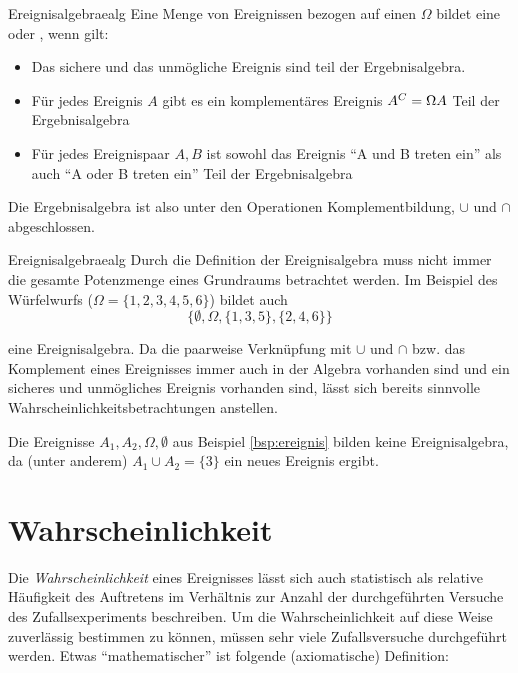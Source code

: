 \begin{definition}{Ereignisalgebra}{ealg}
Eine Menge von Ereignissen bezogen auf einen 
$\Omega$ bildet eine  oder , wenn gilt:

  \begin{itemize}
    \item Das sichere und das unmögliche Ereignis sind teil der Ergebnisalgebra.
    \item{Für jedes Ereignis $A$ gibt es ein komplementäres Ereignis $A^C =
\Omega \\ A$ Teil der Ergebnisalgebra}
    \item{Für jedes Ereignispaar $A,B$ ist sowohl das Ereignis "`A und B treten
ein"' als auch "`A oder B treten ein"' Teil der Ergebnisalgebra}
  \end{itemize}

Die Ergebnisalgebra ist also unter den Operationen Komplementbildung, $\cup$ und
$\cap$ abgeschlossen.
\end{definition}

\begin{example}{Ereignisalgebra}{ealg}
Durch die Definition der Ereignisalgebra muss nicht immer die gesamte Potenzmenge
eines Grundraums betrachtet werden. Im Beispiel des Würfelwurfs ($\Omega =
\{1,2,3,4,5,6\}$) bildet auch
\[\{\emptyset, \Omega, \{1,3,5\}, \{2,4,6\}\}\]

eine Ereignisalgebra. Da die paarweise Verknüpfung mit $\cup$ und $\cap$ bzw. das
Komplement eines Ereignisses immer auch in der Algebra vorhanden sind und ein
sicheres und unmögliches Ereignis vorhanden sind, lässt sich bereits sinnvolle
Wahrscheinlichkeitsbetrachtungen anstellen.

Die Ereignisse $A_1, A_2, \Omega, \emptyset$ aus Beispiel \ref{bsp:ereignis}
bilden keine Ereignisalgebra, da (unter anderem) $A_1 \cup A_2 = \{3\}$ ein
neues Ereignis ergibt.
\end{example}


\section{Wahrscheinlichkeit}

Die \emph{Wahrscheinlichkeit} eines Ereignisses lässt sich auch statistisch als
relative Häufigkeit des Auftretens im Verhältnis zur Anzahl der durchgeführten
Versuche des Zufallsexperiments beschreiben. Um die Wahrscheinlichkeit auf diese
Weise zuverlässig bestimmen zu können, müssen sehr viele Zufallsversuche
durchgeführt werden. Etwas "`mathematischer"' ist folgende (axiomatische)
Definition:

